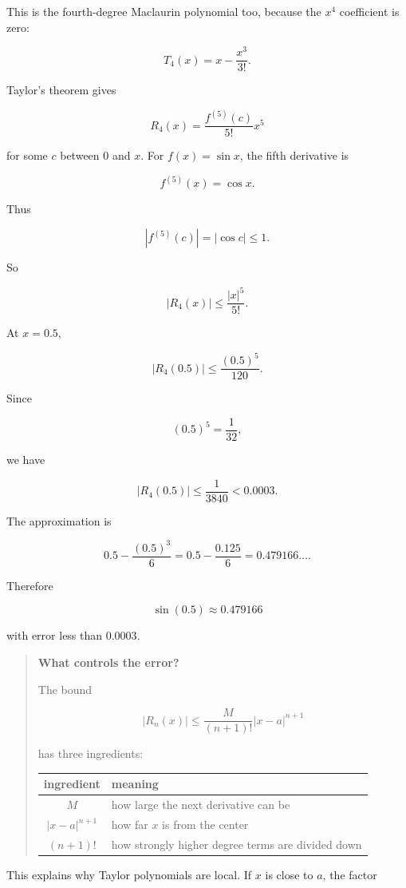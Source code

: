 This is the fourth-degree Maclaurin polynomial too, because the \(x^4\) coefficient is
zero:

\[
T_4(x)=x-\frac{x^3}{3!}.
\]

Taylor's theorem gives

\[
R_4(x)=\frac{f^{(5)}(c)}{5!}x^5
\]

for some \(c\) between \(0\) and \(x\).  For \(f(x)=\sin x\), the fifth derivative is

\[
f^{(5)}(x)=\cos x.
\]

Thus

\[
|f^{(5)}(c)|=|\cos c|\le1.
\]

So

\[
|R_4(x)|\le \frac{|x|^5}{5!}.
\]

At \(x=0.5\),

\[
|R_4(0.5)|\le \frac{(0.5)^5}{120}.
\]

Since

\[
(0.5)^5=\frac1{32},
\]

we have

\[
|R_4(0.5)|\le \frac1{3840}<0.0003.
\]

The approximation is

\[
0.5-\frac{(0.5)^3}{6}
=
0.5-\frac{0.125}{6}
=
0.479166\ldots.
\]

Therefore

\[
\boxed{
\sin(0.5)\approx0.479166
}
\]

with error less than \(0.0003\).

\begin{quote}
\textbf{What controls the error?}

The bound

\[
|R_n(x)|\le
\frac{M}{(n+1)!}|x-a|^{n+1}
\]

has three ingredients:

\begin{center}
\begin{tabular}{c|l}
\textbf{ingredient} & \textbf{meaning} \\ \hline
\(M\) & how large the next derivative can be \\
\(|x-a|^{n+1}\) & how far \(x\) is from the center \\
\((n+1)!\) & how strongly higher degree terms are divided down
\end{tabular}
\end{center}
\end{quote}

This explains why Taylor polynomials are local.  If \(x\) is close to \(a\), the factor

